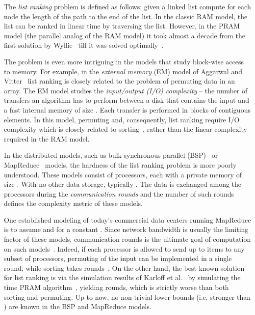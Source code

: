 \documentclass[envcountsame]{llncs}
\begin{document}
The \emph{list ranking} problem is defined as follows: 
given a linked list compute for each node the length of the path to the end of the list.  
In the classic RAM model, the list can be ranked in linear time by traversing the list.
However, in the PRAM model (the parallel analog of the RAM model) it took almost a decade from the first solution by Wyllie~\cite{1979Wyllie} till it was solved optimally~\cite{1988AndersonMillerDetLR}. 


The problem is even more intriguing in the models that study block-wise access to memory. 
For example, in the \emph{external memory} (EM) model of Aggarwal and Vitter~\cite{1988AggarwalVitterEM} list ranking is closely related to the problem of permuting data in an array.
The EM model studies the {\em input/output (I/O) complexity} -- the number of transfers an algorithm has to perform between a disk that contains the input and a fast internal memory of size .
Each transfer is performed in blocks of  contiguous elements.  
In this model, permuting and, consequently, list ranking require I/O complexity which is closely related to sorting~\cite{1995ChiangExternalMemoryGraphAlgorithms}, rather than the linear complexity required in the RAM model.

In the distributed models, such as bulk-synchronous parallel (BSP)~\cite{1990ValiantBSP} or MapReduce~\cite{2008DeanMapReduce} models, the hardness of the list ranking problem is more poorly understood. These models consist of  processors, each with a private memory of size . With no other data storage, typically . The data is exchanged among the processors during the \emph{communication rounds} and the number of such rounds defines the complexity metric of these models. 

One established modeling of today's commercial data centers running MapReduce is to assume  and  for a constant . 
Since network bandwidth is usually the limiting factor of these models,  communication rounds is the ultimate goal of computation on such models~\cite{2010KarloffMapReduce}.
Indeed, if each processor is allowed to send up to  items to any subset of processors, permuting of the input can be implemented in a single round, while sorting takes  rounds~\cite{1999GoodrichBSPSort,2011GoodrichMapReduceSort}.
On the other hand, the best known solution for list ranking is via the simulation results of Karloff et al.~\cite{2010KarloffMapReduce} by simulating the  time PRAM algorithm~\cite{1988AndersonMillerDetLR}, yielding  rounds, which is strictly worse than both sorting and permuting.  
Up to now, no non-trivial lower bounds (i.e. stronger than ) are known in the BSP and MapReduce models.  
\end{document}

